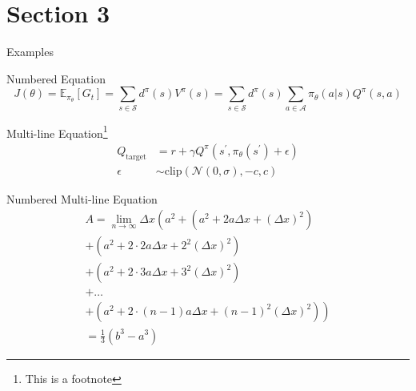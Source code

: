 \section{Section 3}

\begin{frame}{Examples}
    \begin{exampleblock}{Numbered Equation}
        \begin{equation} %
            J(\theta) = \mathbb{E}_{\pi_\theta}[G_t] = \sum_{s\in\mathcal{S}} d^\pi (s)V^\pi(s)=\sum_{s\in\mathcal{S}} d^\pi(s)\sum_{a\in\mathcal{A}}\pi_\theta(a|s)Q^\pi(s,a)
        \end{equation}
    \end{exampleblock}
    \begin{exampleblock}{Multi-line Equation\footnote{This is a footnote}}
        \begin{align}
            Q_\mathrm{target}&=r+\gamma Q^\pi(s^\prime, \pi_\theta(s^\prime)+\epsilon)\\
            \epsilon&\sim\mathrm{clip}(\mathcal{N}(0, \sigma), -c, c)\nonumber
        \end{align}
    \end{exampleblock}
\end{frame}

\begin{frame}
    \begin{exampleblock}{Numbered Multi-line Equation}
        \begin{multline}
            A=\lim_{n\rightarrow\infty}\Delta x\left(a^{2}+\left(a^{2}+2a\Delta x+\left(\Delta x\right)^{2}\right)\right.\label{eq:reset}\\
            +\left(a^{2}+2\cdot2a\Delta x+2^{2}\left(\Delta x\right)^{2}\right)\\
            +\left(a^{2}+2\cdot3a\Delta x+3^{2}\left(\Delta x\right)^{2}\right)\\
            +\ldots\\
            \left.+\left(a^{2}+2\cdot(n-1)a\Delta x+(n-1)^{2}\left(\Delta x\right)^{2}\right)\right)\\
            =\frac{1}{3}\left(b^{3}-a^{3}\right)
        \end{multline}
    \end{exampleblock}
\end{frame}

